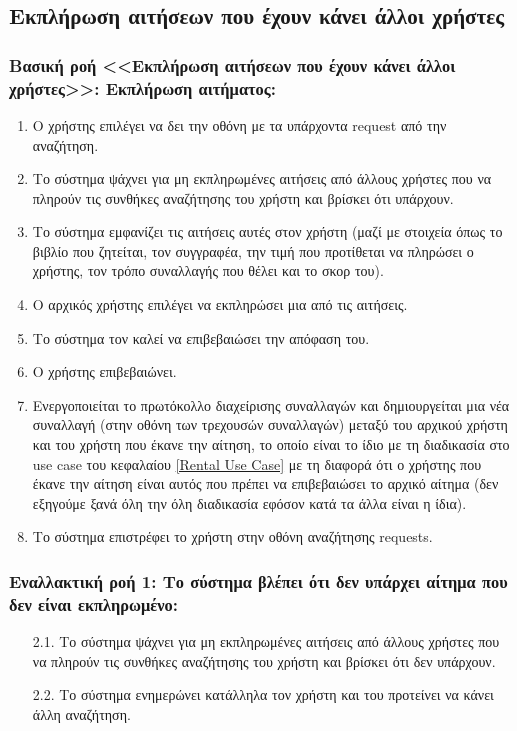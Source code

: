 \documentclass[12pt,a4paper]{article}
\begin{document}
\subsection{Εκπλήρωση αιτήσεων που έχουν κάνει άλλοι χρήστες}

\subsubsection*{Βασική ροή <<Εκπλήρωση αιτήσεων που έχουν κάνει άλλοι χρήστες>>: Εκπλήρωση αιτήματος:}
\begin{enumerate}
    \item Ο χρήστης επιλέγει να δει την οθόνη με τα υπάρχοντα request από την αναζήτηση.
    \item Το σύστημα ψάχνει για μη εκπληρωμένες αιτήσεις από άλλους χρήστες που να πληρούν τις συνθήκες αναζήτησης του χρήστη και βρίσκει ότι υπάρχουν.
    \item Το σύστημα εμφανίζει τις αιτήσεις αυτές στον χρήστη (μαζί με στοιχεία όπως το βιβλίο που ζητείται, τον συγγραφέα, την τιμή που προτίθεται να πληρώσει ο χρήστης, τον τρόπο συναλλαγής που θέλει και το σκορ του). 
    \item Ο αρχικός χρήστης επιλέγει να εκπληρώσει μια από τις αιτήσεις.
    \item Το σύστημα τον καλεί να επιβεβαιώσει την απόφαση του.
    \item Ο χρήστης επιβεβαιώνει.
    \item Ενεργοποιείται το πρωτόκολλο διαχείρισης συναλλαγών και δημιουργείται μια νέα συναλλαγή (στην οθόνη των τρεχουσών συναλλαγών) μεταξύ του αρχικού χρήστη και του χρήστη που έκανε την αίτηση, το οποίο είναι το ίδιο με τη διαδικασία στο use case του κεφαλαίου \ref{Rental Use Case} με τη διαφορά ότι ο χρήστης που έκανε την αίτηση είναι αυτός που πρέπει να επιβεβαιώσει το αρχικό αίτημα (δεν εξηγούμε ξανά όλη την όλη διαδικασία εφόσον κατά τα άλλα είναι η ίδια).
    \item Το σύστημα επιστρέφει το χρήστη στην οθόνη αναζήτησης requests.
\end{enumerate}

\subsubsection*{Εναλλακτική ροή 1: Το σύστημα βλέπει ότι δεν υπάρχει αίτημα που δεν είναι εκπληρωμένο:}
\begin{enumerate}
    \item [2.1.] Το σύστημα ψάχνει για μη εκπληρωμένες αιτήσεις από άλλους χρήστες που να πληρούν τις συνθήκες αναζήτησης του χρήστη και βρίσκει ότι δεν υπάρχουν.
    \item [2.2.] Το σύστημα ενημερώνει κατάλληλα τον χρήστη και του προτείνει να κάνει άλλη αναζήτηση.
\end{enumerate}
\end{document}
